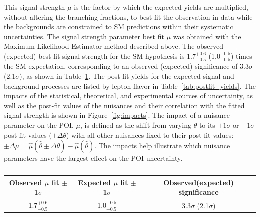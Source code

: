 This signal strength $\mu$ is the factor by which the expected \tth yields are multiplied, without altering the branching fractions, to best-fit the observation in data
while the backgrounds are constrained to SM predictions within their systematic uncertainties. %
The signal strength parameter best fit $\mu$ was obtained with the Maximum Likelihood Estimator method described above.
The observed (expected) best fit signal strength for the SM \tth hypothesis is 1.7$^{+0.6}_{-0.5}$ (1.0$^{+0.5}_{-0.5}$) times the SM expectation,
corresponding to an observed (expected) significance of 3.3$\sigma$ (2.1$\sigma$), as shown in Table~\ref{tab:mu}.
The post-fit yields for the expected signal and background processes are listed by lepton flavor in Table~\ref{tab:postfit_yields}.
The impacts of the statistical, theoretical, and experimental sources of uncertainty, as well as the post-fit values of the nuisances and their correlation with
the fitted signal strength is shown in Figure~\ref{fig:impacts}. The impact of a nuisance parameter on the POI, $\mu$, is defined as the shift
from varying $\theta$ to its $+1\sigma$ or $-1\sigma$ post-fit values ($\pm\Delta\theta$) with all other nuisances fixed to their post-fit values:
$\pm\Delta\mu = \hat{\mu}(\hat{\theta}\pm\Delta\theta) -\hat{\mu}(\hat{\theta})$. The impacts help illustrate which nuisance parameters have the largest effect on
the POI uncertainty. 


\begin{table}[htbp]
\begin{center}
  \caption[Table of best-fit signal strength]{}
    \begin{tabular}{c c c} \hline
      Observed $\mu$ fit $\pm$1$\sigma$ & Expected $\mu$ fit $\pm$1$\sigma$ & Observed(expected) significance & \\ \hline 
      1.7$^{+0.6}_{-0.5}$ & 1.0$^{+0.5}_{-0.5}$ & 3.3$\sigma$ (2.1$\sigma$)  \\
      \hline
    \end{tabular}
    \label{tab:mu}
\end{center}
\end{table}



